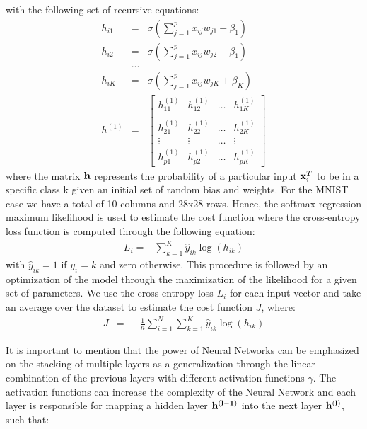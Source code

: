 \documentclass{article}
\begin{document}
with the following set of recursive equations:
\begin{eqnarray}
h_{i1}&=&\sigma(\sum_{j=1}^{p} x_{ij} w_{j1}+\beta_{1} ) \nonumber \\
h_{i2}&=&\sigma(\sum_{j=1}^{p} x_{ij} w_{j2}+\beta_{1} ) \nonumber \\
&...& \nonumber \\
h_{iK}&=&\sigma(\sum_{j=1}^{p} x_{ij} w_{jK}+\beta_{K} )  \\
h^{(1)}&=&\begin{bmatrix}
h_{11}^{(1)} & h_{12}^{(1)} &  \dots & h_{1K}^{(1)} \\ \\
h_{21}^{(1)} & h_{22}^{(1)} & \dots & h_{2K}^{(1)} \\
\vdots & \vdots & \dots & \vdots \\
h_{p1}^{(1)} & h_{p2}^{(1)} & \dots & h_{pK}^{(1)}
\end{bmatrix} 
\label{two-layer}
\end{eqnarray}
where the matrix $\bold{h}$ represents the probability of a particular input $\bold{x}^T_i$ to be in a specific class k given an initial set of random bias and weights. For the MNIST case we have a total of 10 columns and 28x28 rows. Hence, the softmax regression maximum likelihood is used to estimate the cost function where the cross-entropy loss function is computed through the following equation:
\begin{eqnarray}
L_i= - \sum_{k=1}^{K}\hat{y}_{ik}\log (h_{ik})
\end{eqnarray}
with $\hat{y}_{ik}=1$ if $y_i = k$ and zero otherwise. This procedure is followed by an optimization of the model through the maximization of the likelihood for a given set of parameters. We use the cross-entropy loss $L_i$ for each input vector and take an average over the dataset to estimate the cost function $J$, where:
\begin{eqnarray}
J &=& -\frac{1}{n} \sum_{i=1}^{N} \sum_{k=1}^{K}\hat{y}_{ik}\log (h_{ik})
\end{eqnarray}

It is important to mention that the power of Neural Networks can be emphasized on the stacking of multiple layers as a generalization through the linear combination of the previous layers with different activation functions $\gamma$. The activation functions can increase the complexity of the Neural Network and each layer is responsible for mapping a hidden layer $\bf{h}^{(l-1)}$ into the next layer $\bf{h}^{(l)}$, such that:
\end{document}
